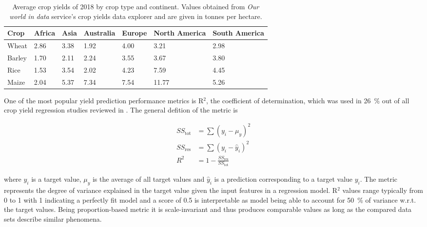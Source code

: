 \begin{table}[htb]
    \centering
    \scriptsize
    \caption{Average crop yields of 2018 by crop type and continent. Values obtained from \emph{Our world in data} service's crop yields data explorer \cite{owidcropyields} and are given in tonnes per hectare.}
    \label{tab:iii-crop-yield-variation}
    \vspace{0.3cm}
    \begin{tabular}{@{}lllllll@{}}

    \toprule
    \textbf{Crop} & \textbf{Africa} & \textbf{Asia} & \textbf{Australia} & \textbf{Europe} & \textbf{North America} & \textbf{South America} \\ \midrule
    Wheat         & 2.86            & 3.38          & 1.92               & 4.00            & 3.21                   & 2.98                   \\
    Barley        & 1.70            & 2.11          & 2.24               & 3.55            & 3.67                   & 3.80                   \\
    Rice          & 1.53            & 3.54          & 2.02               & 4.23            & 7.59                   & 4.45                   \\
    Maize         & 2.04            & 5.37          & 7.34               & 7.54            & 11.77                  & 5.26                   \\ \bottomrule
    \end{tabular}
\end{table}

One of the most popular yield prediction performance metrics is R$^2$, the coefficient of determination, which was used in 26~\% out of all crop yield regression studies reviewed in \cite{VanKlompenburg2020}. The general defition of the metric is 

\begin{equation}
    \begin{split}
    SS_{\text{tot}} & = \sum{(y_i-\mu_y)^2} \\
    SS_{\text{res}} & = \sum{(y_i-\hat{y}_i)^2} \\
    R^2 & = 1-\frac{SS_{\text{res}}}{SS_{\text{tot}}}
    \end{split}
\end{equation}

\noindent where $y_i$ is a target value, $\mu_y$ is the average of all target values and $\hat{y}_i$ is a prediction corresponding to a target value $y_i$. The metric represents the degree of variance explained in the target value given the input features in a regression model. R$^2$ values range typically from 0 to 1 with 1 indicating a perfectly fit model and a score of 0.5 is interpretable as model being able to account for 50~\% of variance w.r.t. the target values. Being proportion-based metric it is scale-invariant and thus produces comparable values as long as the compared data sets describe similar phenomena. 

